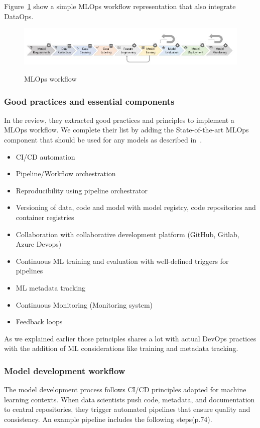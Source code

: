 Figure~\ref{fig:mlops-workflow} show a simple MLOps workflow representation that also integrate DataOps.
\begin{figure}[!htbp]
    \caption{MLOps workflow\cite{8804457}}
    \centering
    \includegraphics[scale=0.6]{images/mlops-workflow-9-stages}
    \label{fig:mlops-workflow}
\end{figure}

\subsubsection{Good practices and essential components}

In the review\cite{Kreuzberger2022MachineLO}, they extracted good practices and principles to implement a MLOps workflow.
We complete their list by adding the State-of-the-art MLOps component that should be used for any models as described in~\cite{BURGUENOROMERO2025107499}.

\begin{itemize}
    \item CI/CD automation
    \item Pipeline/Workflow orchestration
    \item Reproducibility using pipeline orchestrator
    \item Versioning of data, code and model with model registry, code repositories and container registries
    \item Collaboration with collaborative development platform (GitHub, Gitlab, Azure Devops)
    \item Continuous ML training and evaluation with well-defined triggers for pipelines
    \item ML metadata tracking
    \item Continuous Monitoring (Monitoring system)
    \item Feedback loops
\end{itemize}

As we explained earlier those principles shares a lot with actual DevOps practices with the addition of ML considerations
like training and metadata tracking.

\subsubsection{Model development workflow}
The model development process follows CI/CD principles adapted for machine learning contexts.
When data scientists push code, metadata, and documentation to central repositories,
they trigger automated pipelines that ensure quality and consistency\cite{10855428}.
An example pipeline includes the following steps\cite{treveil2020introducing}(p.74).

